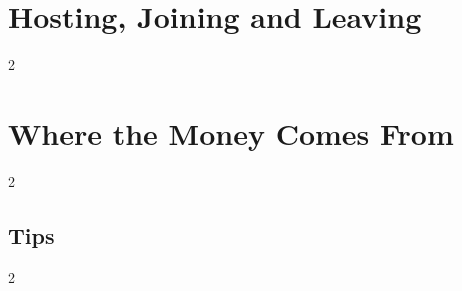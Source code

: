 \documentclass[12pt,letterpaper]{article}
\begin{document}
\renewcommand{\secstatus}{THE LOBBY \quad // \quad THE HOST \quad // \quad SEATS AND BOTS}
\chapter{Hosting, Joining and Leaving}
\begin{multicols}{2}
\end{multicols}

\renewcommand{\secstatus}{\MakeUppercase{\V{finderscut}} \quad // \quad \MakeUppercase{\V{root}} AND \MakeUppercase{\V{sudo}} \quad // \quad CASH}
\chapter{Where the Money Comes From}
\begin{multicols}{2}
\end{multicols}

\renewcommand{\secstatus}{EARLY \quad // \quad MIDDLE \quad // \quad LATE}
\vspace{24pt}\section{Tips}                  %
\begin{multicols}{2}
\end{multicols}

\renewcommand{\secstatus}{THE RULES \quad // \quad THE COCO}
\end{document}
